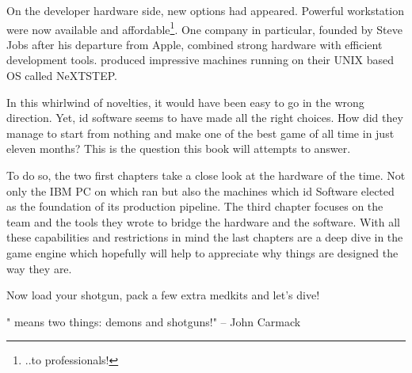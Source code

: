  \par
 On the developer hardware side, new options had appeared. Powerful workstation were now available and affordable\footnote{..to professionals!}. One company in particular, founded by Steve Jobs after his departure from Apple, combined strong hardware with efficient development tools. \NeXT produced impressive machines running on their UNIX based OS called NeXTSTEP.\\%
 \par
 In this whirlwind of novelties, it would have been easy to go in the wrong direction. Yet, id software seems to have made all the right choices. How did they manage to start from nothing and make one of the best game of all time in just eleven months? This is the question this book will attempts to answer.\\
 \par
 To do so, the two first chapters take a close look at the hardware of the time. Not only the IBM PC on which \doom{} ran but also the \NeXT machines which id Software elected as the foundation of its production pipeline. The third chapter focuses on the team and the tools they wrote to bridge the hardware and the software. With all these capabilities and restrictions in mind the last chapters are a deep dive in the game engine which hopefully will help to appreciate why things are designed the way they are.\\
\par
Now load your shotgun, pack a few extra medkits and let's dive!\\
\par
\centering "\doom{} means two things: demons and shotguns!" -- John Carmack


